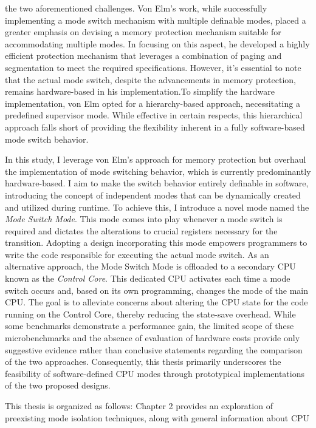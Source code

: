 the two aforementioned challenges. Von Elm's work, while successfully
implementing a mode switch mechanism with multiple definable modes, placed a
greater emphasis on devising a memory protection mechanism suitable for
accommodating multiple modes. In focusing on this aspect, he developed a
highly efficient protection mechanism that leverages a combination of paging and
segmentation to meet the required specifications. However, it's essential to
note that the actual mode switch, despite the advancements in memory protection,
remains hardware-based in his implementation.To simplify the hardware
implementation, von Elm opted for a hierarchy-based approach, necessitating a
predefined supervisor mode. While effective in certain respects, this
hierarchical approach falls short of providing the flexibility inherent in a
fully software-based mode switch behavior.\par
In this study, I leverage von Elm's approach for memory protection but overhaul
the implementation of mode switching behavior, which is currently predominantly
hardware-based. I aim to make the switch behavior entirely definable in
software, introducing the concept of independent modes that can be dynamically
created and utilized during runtime. To achieve this, I introduce a novel mode
named the \emph{Mode Switch Mode}. This mode comes into play whenever a mode switch
is required and dictates the alterations to crucial registers necessary for the
transition. Adopting a design incorporating this mode empowers programmers to
write the code responsible for executing the actual mode switch. As an
alternative approach, the Mode Switch Mode is offloaded to a secondary CPU known
as the \emph{Control Core}. This dedicated CPU activates each time a mode switch
occurs and, based on its own programming, changes the mode of the main CPU. The
goal is to alleviate concerns about altering the CPU state for the code running
on the Control Core, thereby reducing the state-save overhead. While some
benchmarks demonstrate a performance gain, the limited scope of these
microbenchmarks and the absence of evaluation of hardware costs provide only
suggestive evidence rather than conclusive statements regarding the comparison
of the two approaches. Consequently, this thesis primarily underscores the
feasibility of software-defined CPU modes through prototypical implementations
of the two proposed designs.\par
This thesis is organized as follows: Chapter 2 provides an exploration of
preexisting mode isolation techniques, along with general information about CPU
